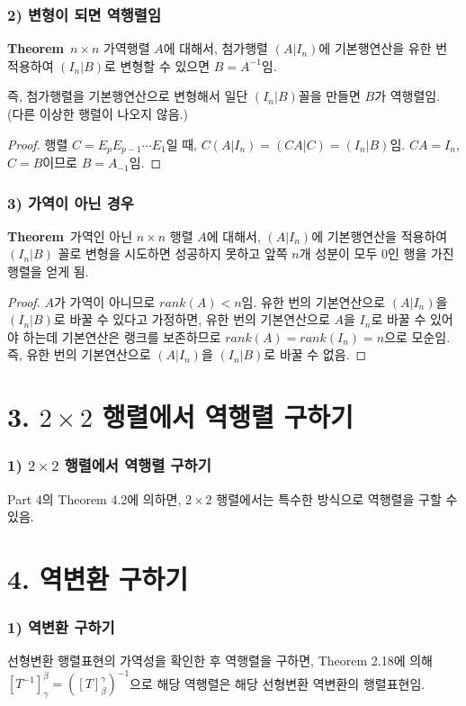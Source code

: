 \subsubsection*{2) 변형이 되면 역행렬임}
\textbf{Theorem}\, $n \times n$ 가역행렬 $A$에 대해서, 첨가행렬 $(A|I_n)$에 기본행연산을 유한 번 적용하여 $(I_n|B)$로 변형할 수 있으면 $B=A^{-1}$임.

즉, 첨가행렬을 기본행연산으로 변형해서 일단 $(I_n|B)$꼴을 만들면 $B$가 역행렬임. (다른 이상한 행렬이 나오지 않음.)

\begin{proof}
행렬 $C=E_{p}E_{p-1} \cdots E_1$일 때, $C(A|I_n)=(CA|C)=(I_n|B)$임. $CA=I_n$, $C=B$이므로 $B=A_{-1}$임.
\end{proof}

\subsubsection*{3) 가역이 아닌 경우}
\textbf{Theorem}\, 가역인 아닌 $n \times n$ 행렬 $A$에 대해서, $(A|I_n)$에 기본행연산을 적용하여 $(I_n|B)$ 꼴로 변형을 시도하면 성공하지 못하고 앞쪽 $n$개 성분이 모두 0인 행을 가진 행렬을 얻게 됨.

\begin{proof}
$A$가 가역이 아니므로 $rank(A) < n$임. 유한 번의 기본연산으로 $(A|I_n)$을 $(I_n|B)$로 바꿀 수 있다고 가정하면, 유한 번의 기본연산으로 $A$을 $I_n$로 바꿀 수 있어야 하는데 기본연산은 랭크를 보존하므로 $rank(A)=rank(I_n)=n$으로 모순임. 즉, 유한 번의 기본연산으로 $(A|I_n)$을 $(I_n|B)$로 바꿀 수 없음.
\end{proof}


\newpage


\section*{3. $2 \times 2$ 행렬에서 역행렬 구하기}
\subsubsection*{1) $2 \times 2$ 행렬에서 역행렬 구하기}
Part 4의 Theorem 4.2에 의하면, $2 \times 2$ 행렬에서는 특수한 방식으로 역행렬을 구할 수 있음.\\


\section*{4. 역변환 구하기}
\subsubsection*{1) 역변환 구하기}
선형변환 행렬표현의 가역성을 확인한 후 역행렬을 구하면, Theorem 2.18에 의해 $[T^{-1}]_{\gamma}^{\beta}=([T]_{\beta}^{\gamma})^{-1}$으로 해당 역행렬은 해당 선형변환 역변환의 행렬표현임.

